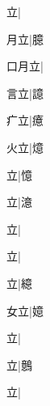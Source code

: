 \begin{multicols}{2}
{{立}|{}\par
{\cjk{}{\cnsym{}　}月立}|{\cjk{}臆}\par
{\cjk{}口月立}|{}\par
{\cjk{}{\cnsym{}　}言立}|{\cjk{}譩}\par
{\cjk{}{\cnsym{}　}疒立}|{\cjk{}癔}\par
{\cjk{}{\cnsym{}　}火立}|{\cjk{}燱}\par
{立}|{\cjk{}憶}\par
{立}|{\cjk{}澺}\par
{立}|{}\par
{立}|{}\par
{立}|{\cjk{}繶}\par
{\cjk{}{\cnsym{}　}女立}|{\cjk{}嬑}\par
{\cjk{}{\cnsym{}　}{\cnsym{}　}立}|{}\par
{\cjk{}{\cnsym{}　}{\cnsym{}　}立}|{\cjk{}鷾}\par
{\cjk{}{\cnsym{}　}{\cnsym{}　}立}|{}\par
}
\end{multicols}
